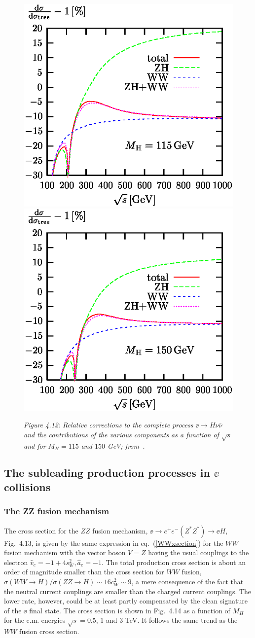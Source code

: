 {\begin{figure}[!h]
\vspace*{-1mm}
\centerline{\includegraphics[width=.5\textwidth]{./sm4/rel.115.eps}
\includegraphics[width=.5\textwidth]{./sm4/rel.150.eps}}
\vspace*{1mm}
{\it Figure 4.12: Relative  corrections to the complete process $\ee \to H 
\nu\bar{\nu}$ and the contributions of the various components as a function
of $\sqrt{s}$ and for $M_H=115$ and $150$ GeV; from~\cite{RCWW1}.}
\label{fi:corr}
\vspace*{-1.1cm}
\end{figure}

\subsection{The subleading production processes in $\ee$ collisions}

\subsubsection{The ZZ fusion mechanism}

The cross section for the $ZZ$ fusion mechanism, $\ee \to e^+e^- (Z^*Z^*) \to
\ee H$, Fig.~4.13, is given by the same expression in eq.~(\ref{WWxsection})
for the $WW$ fusion mechanism with the vector boson  $V=Z$ having the usual
couplings to the electron $\hat{v}_e=-1+4s_W^2 , \hat{a}_e=-1$. The total
production  cross section is about an order of magnitude smaller than the cross
section for $WW$ fusion, $\sigma(WW \to H)/\sigma (ZZ \to H)  \sim 16 c_W^2
\sim 9$,  a mere consequence of the fact that the neutral current couplings are
smaller than the charged current couplings. The lower rate, however, could be
at least partly compensated by the clean signature of the $\ee$ final state.
The cross section is shown in Fig.~4.14 as a function of $M_H$ for the c.m.
energies $\sqrt{s}=0.5$, 1 and 3 TeV. It follows the same trend as the $WW$
fusion cross section.  

}
